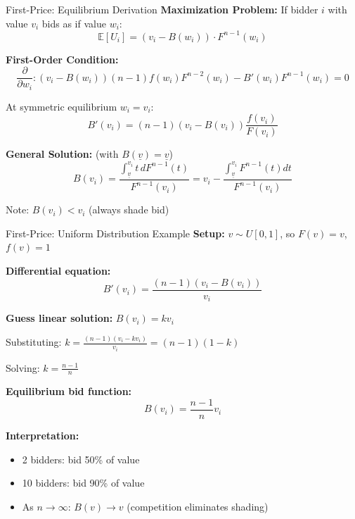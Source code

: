 \documentclass[xcolor={x11names}]{beamer}
\newcommand{\E}{\mathbb{E}}
\begin{document}
\begin{frame}{First-Price: Equilibrium Derivation}
\textbf{Maximization Problem:}
If bidder $i$ with value $v_i$ bids as if value $w_i$:
$$\E[U_i] = (v_i - B(w_i)) \cdot F^{n-1}(w_i)$$


\textbf{First-Order Condition:}
$$\frac{\partial}{\partial w_i}: (v_i - B(w_i))(n-1)f(w_i)F^{n-2}(w_i) - B'(w_i)F^{n-1}(w_i) = 0$$

At symmetric equilibrium $w_i = v_i$:
$$B'(v_i) = (n-1)(v_i - B(v_i))\frac{f(v_i)}{F(v_i)}$$

\textbf{General Solution:} (with $B(\underline{v}) = \underline{v}$)
$$B(v_i) = \frac{\int_{\underline{v}}^{v_i} t \, dF^{n-1}(t)}{F^{n-1}(v_i)} = v_i - \frac{\int_{\underline{v}}^{v_i} F^{n-1}(t)dt}{F^{n-1}(v_i)}$$

Note: $B(v_i) < v_i$ (always shade bid)
\end{frame}

\begin{frame}{First-Price: Uniform Distribution Example}
\textbf{Setup:} $v \sim U[0,1]$, so $F(v) = v$, $f(v) = 1$

\textbf{Differential equation:}
$$B'(v_i) = \frac{(n-1)(v_i - B(v_i))}{v_i}$$

\textbf{Guess linear solution:} $B(v_i) = kv_i$

Substituting: $k = \frac{(n-1)(v_i - kv_i)}{v_i} = (n-1)(1-k)$

Solving: $k = \frac{n-1}{n}$

\textbf{Equilibrium bid function:}
$$B(v_i) = \frac{n-1}{n} v_i$$

\textbf{Interpretation:}
\begin{itemize}
  \item 2 bidders: bid 50\% of value
  \item 10 bidders: bid 90\% of value  
  \item As $n \to \infty$: $B(v) \to v$ (competition eliminates shading)
\end{itemize}
\end{frame}
\end{document}

